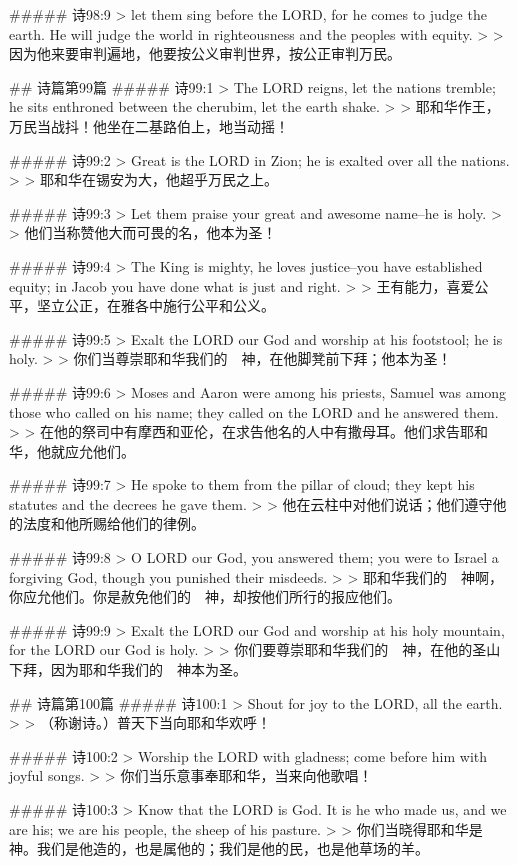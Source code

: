 ##### 诗98:9
> let them sing before the LORD, for he comes to judge the earth. He will judge the world in righteousness and the peoples with equity.
>
> 因为他来要审判遍地，他要按公义审判世界，按公正审判万民。


## 诗篇第99篇
##### 诗99:1
> The LORD reigns, let the nations tremble; he sits enthroned between the cherubim, let the earth shake.
>
> 耶和华作王，万民当战抖！他坐在二基路伯上，地当动摇！


##### 诗99:2
> Great is the LORD in Zion; he is exalted over all the nations.
>
> 耶和华在锡安为大，他超乎万民之上。


##### 诗99:3
> Let them praise your great and awesome name--he is holy.
>
> 他们当称赞他大而可畏的名，他本为圣！


##### 诗99:4
> The King is mighty, he loves justice--you have established equity; in Jacob you have done what is just and right.
>
> 王有能力，喜爱公平，坚立公正，在雅各中施行公平和公义。


##### 诗99:5
> Exalt the LORD our God and worship at his footstool; he is holy.
>
> 你们当尊崇耶和华我们的　神，在他脚凳前下拜；他本为圣！


##### 诗99:6
> Moses and Aaron were among his priests, Samuel was among those who called on his name; they called on the LORD and he answered them.
>
> 在他的祭司中有摩西和亚伦，在求告他名的人中有撒母耳。他们求告耶和华，他就应允他们。


##### 诗99:7
> He spoke to them from the pillar of cloud; they kept his statutes and the decrees he gave them.
>
> 他在云柱中对他们说话；他们遵守他的法度和他所赐给他们的律例。


##### 诗99:8
> O LORD our God, you answered them; you were to Israel a forgiving God, though you punished their misdeeds.
>
> 耶和华我们的　神啊，你应允他们。你是赦免他们的　神，却按他们所行的报应他们。


##### 诗99:9
> Exalt the LORD our God and worship at his holy mountain, for the LORD our God is holy.
>
> 你们要尊崇耶和华我们的　神，在他的圣山下拜，因为耶和华我们的　神本为圣。


## 诗篇第100篇
##### 诗100:1
> Shout for joy to the LORD, all the earth.
>
> （称谢诗。）普天下当向耶和华欢呼！


##### 诗100:2
> Worship the LORD with gladness; come before him with joyful songs.
>
> 你们当乐意事奉耶和华，当来向他歌唱！


##### 诗100:3
> Know that the LORD is God. It is he who made us, and we are his; we are his people, the sheep of his pasture.
>
> 你们当晓得耶和华是　神。我们是他造的，也是属他的；我们是他的民，也是他草场的羊。


